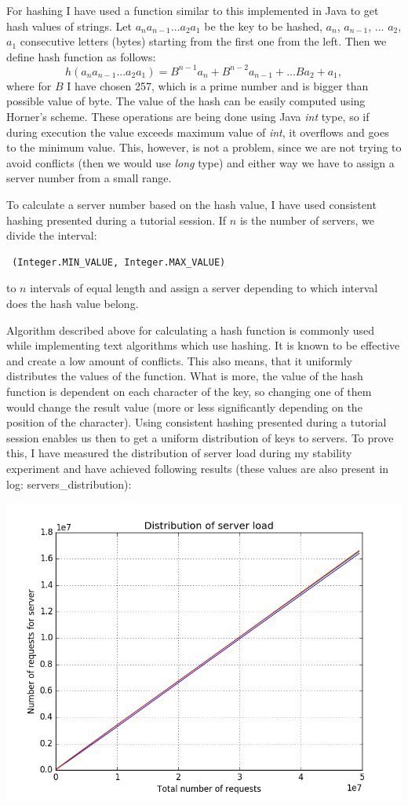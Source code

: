 \documentclass[11pt]{article}
\begin{document}
For hashing I have used a function similar to this implemented in Java to get hash values of strings. Let $a_na_{n-1}...a_2a_1$ be the key to be hashed, $a_n$, $a_{n-1}$, ... $a_2$, $a_1$ consecutive letters (bytes) starting from the first one from the left. Then we define hash function as follows:
$$h(a_na_{n-1}...a_2a_1) = B^{n-1}a_n + B^{n-2}a_{n-1} + ... Ba_2 + a_1,$$
where for $B$ I have chosen 257, which is a prime number and is bigger than possible value of byte. The value of the hash can be easily computed using Horner's scheme. These operations are being done using Java {\it int} type, so if during execution the value exceeds maximum value of {\it int}, it overflows and goes to the minimum value. This, however, is not a problem, since we are not trying to avoid conflicts (then we would use {\it long} type) and either way we have to assign a server number from a small range. 

To calculate a server number based on the hash value, I have used consistent hashing presented during a tutorial session. If $n$ is the number of servers, we divide the interval: \begin{verbatim} (Integer.MIN_VALUE, Integer.MAX_VALUE)\end{verbatim} to $n$ intervals of equal length and assign a server depending to which interval does the hash value belong.

Algorithm described above for calculating a hash function is commonly used while implementing text algorithms which use hashing. It is known to be effective and create a low amount of conflicts. This also means, that it uniformly distributes the values of the function. What is more, the value of the hash function is dependent on each character of the key, so changing one of them would change the result value (more or less significantly depending on the position of the character). Using consistent hashing presented during a tutorial session enables us then to get a uniform distribution of keys to servers. To prove this, I have measured the distribution of server load during my stability experiment and have achieved following results (these values are also present in log: servers\_distribution):

\includegraphics[scale=0.6]{servers_distribution.png}
\end{document}
